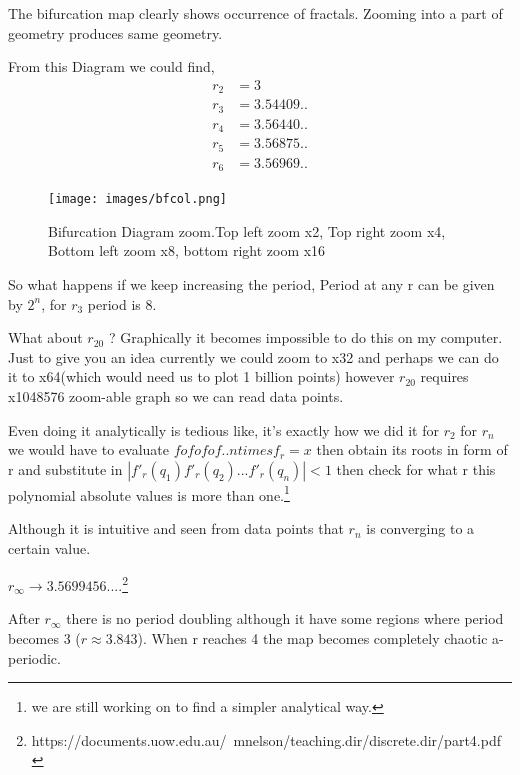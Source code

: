 \documentclass{report}
\begin{document}
The bifurcation map clearly shows occurrence of fractals. Zooming into a part of geometry produces same geometry.

From this Diagram we could find,
\begin{align}
    r_2 &= 3 \nonumber \\
    r_3 &= 3.54409.. \nonumber \\
    r_4 &= 3.56440.. \nonumber \\
    r_5 &= 3.56875.. \nonumber \\
    r_6 &= 3.56969.. \nonumber
\end{align}
\newpage

\begin{figure}[!h]
    \centering
    \texttt{[image: images/bfcol.png]}
    \caption{Bifurcation Diagram zoom.Top left zoom x2, Top right zoom x4, Bottom left zoom x8, bottom right zoom x16}
    \label{fig:my_label5}
\end{figure}

So what happens if we keep increasing the period, Period at any r can be given by $2^n$, for $r_3$ period is 8.

What about $r_{20}$ ? Graphically it becomes impossible to do this on my computer. Just to give you an idea currently we could zoom to x32 and perhaps we can do it to x64(which would need us to plot 1 billion points) however $r_{20}$ requires x1048576 zoom-able graph so we can read data points.
\newline

Even doing it analytically is tedious like, it's exactly how we did it for $r_2$ for $r_n$ we would have to evaluate $fofofof..ntimesf_r = x$ then obtain its roots in form of r and substitute in $|f'_r(q_1)f'_r(q_2)...f'_r(q_n)| < 1$ then check for what r this polynomial absolute values is more than one.\footnote[1]{we are still working on to find a simpler analytical way.}
\newline

Although it is intuitive and seen from data points that $r_n$ is converging to a certain value. \newline

$r_\infty \to 3.5699456....$\footnote[2]{https://documents.uow.edu.au/~mnelson/teaching.dir/discrete.dir/part4.pdf}
\newline

After $r_\infty$ there is no period doubling although it have some regions where period becomes 3 ($r \approx 3.843$). When r reaches 4 the map becomes completely  chaotic a-periodic.
\newpage
\end{document}
